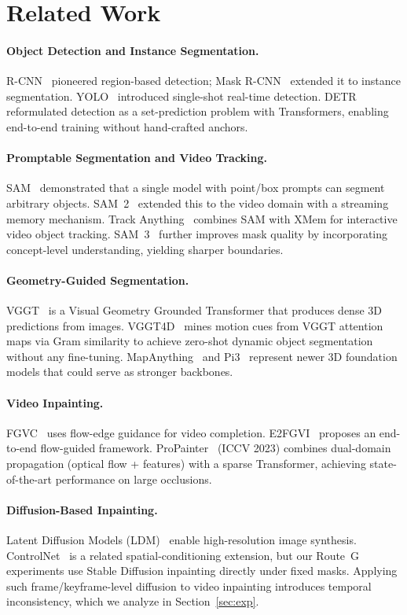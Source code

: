 \section{Related Work}
\label{sec:related}

\paragraph{Object Detection and Instance Segmentation.}
R-CNN~\cite{rcnn} pioneered region-based detection; Mask R-CNN~\cite{maskrcnn} extended it
to instance segmentation. YOLO~\cite{yolo} introduced single-shot real-time detection.
DETR~\cite{detr} reformulated detection as a set-prediction problem with Transformers,
enabling end-to-end training without hand-crafted anchors.

\paragraph{Promptable Segmentation and Video Tracking.}
SAM~\cite{sam} demonstrated that a single model with point/box prompts can segment
arbitrary objects. SAM~2~\cite{sam2} extended this to the video domain with a streaming
memory mechanism. Track Anything~\cite{trackanything} combines SAM with XMem for
interactive video object tracking. SAM~3~\cite{sam3} further improves mask quality by
incorporating concept-level understanding, yielding sharper boundaries.

\paragraph{Geometry-Guided Segmentation.}
VGGT~\cite{vggt} is a Visual Geometry Grounded Transformer that produces dense 3D
predictions from images. VGGT4D~\cite{vggt4d} mines motion cues from VGGT attention maps
via Gram similarity to achieve zero-shot dynamic object segmentation without any
fine-tuning. MapAnything~\cite{mapanything} and Pi3~\cite{pi3} represent newer 3D
foundation models that could serve as stronger backbones.

\paragraph{Video Inpainting.}
FGVC~\cite{fgvc} uses flow-edge guidance for video completion. E2FGVI~\cite{e2fgvi}
proposes an end-to-end flow-guided framework. ProPainter~\cite{propainter} (ICCV 2023)
combines dual-domain propagation (optical flow + features) with a sparse Transformer,
achieving state-of-the-art performance on large occlusions.

\paragraph{Diffusion-Based Inpainting.}
Latent Diffusion Models (LDM)~\cite{ldm} enable high-resolution image synthesis.
ControlNet~\cite{controlnet} is a related spatial-conditioning extension, but our
Route~G experiments use Stable Diffusion inpainting directly under fixed masks. Applying
such frame/keyframe-level diffusion to video inpainting introduces temporal inconsistency,
which we analyze in Section~\ref{sec:exp}.
